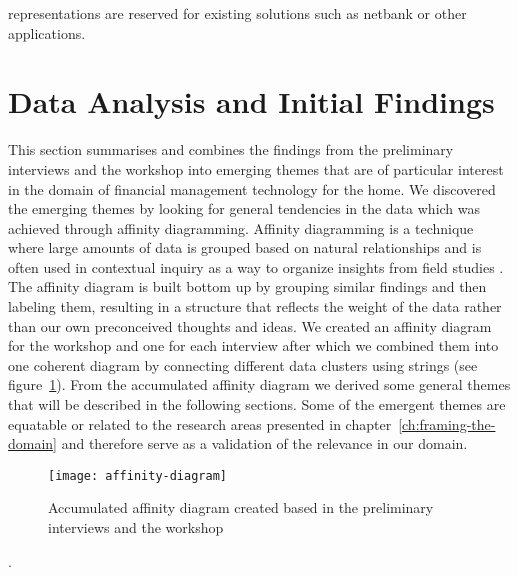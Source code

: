 representations are reserved for existing solutions such as netbank or other applications.

\section{Data Analysis and Initial Findings}
This section summarises and combines the findings from the preliminary interviews and the workshop into emerging themes that are of particular interest in the domain of financial management technology for the home. We discovered the emerging themes by looking for general tendencies in the data which was achieved through affinity diagramming. Affinity diagramming is a technique where large amounts of data is grouped based on natural relationships and is often used in contextual inquiry as a way to organize insights from field studies \cite{beyer2010user}. The affinity diagram is built bottom up by grouping similar findings and then labeling them, resulting in a structure that reflects the weight of the data rather than our own preconceived thoughts and ideas. We created an affinity diagram for the workshop and one for each interview after which we combined them into one coherent diagram by connecting different data clusters using strings (see figure~\ref{fig:affinity-diagram}). From the accumulated affinity diagram we derived some general themes that will be described in the following sections. Some of the emergent themes are equatable or related to the research areas presented in chapter~\ref{ch:framing-the-domain} and therefore serve as a validation of the relevance in our domain.

\begin{figure}[!h]
	\centering
	\texttt{[image: affinity-diagram]}
	\caption{Accumulated affinity diagram created based in the preliminary interviews and the workshop}
	\label{fig:affinity-diagram}
\end{figure}.

